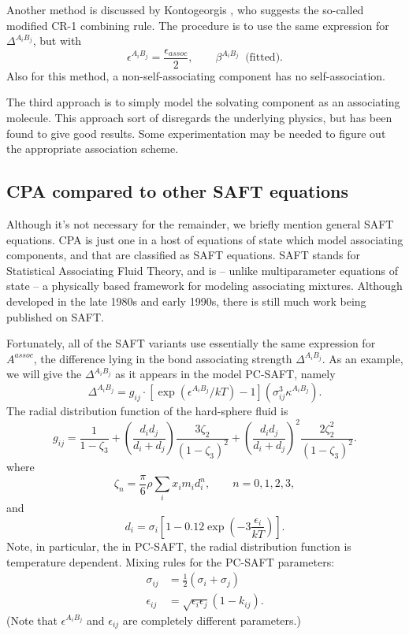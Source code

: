 \documentclass[english]{../thermomemo/thermomemo}
\newcommand{\z}{\zeta}
\newcommand{\lp}{\left(}
\newcommand{\rp}{\right)}
\begin{document}
Another method is discussed by Kontogeorgis \cite{Kontogeorgis10}, who suggests the so-called modified CR-1 combining rule. The procedure is to use the same expression for $\Delta^{A_i B_j}$, but with
\begin{equation}
  \epsilon^{A_i B_j} = \frac{\epsilon_{assoc}}{2}, \qquad \beta^{A_i B_j} \ \text{ (fitted)}.
\end{equation}
Also for this method, a non-self-associating component has no self-association.

The third approach is to simply model the solvating component as an associating molecule. This approach sort of disregards the underlying physics, but has been found to give good results. Some experimentation may be needed to figure out the appropriate association scheme. %


\subsection{CPA compared to other SAFT equations}
Although it's not necessary for the remainder, we briefly mention general SAFT equations. CPA is just one in a host of equations of state which model associating components, and that are classified as SAFT equations. SAFT stands for Statistical Associating Fluid Theory, and is -- unlike multiparameter equations of state -- a physically based framework for modeling associating mixtures. Although developed in the late 1980s and early 1990s, there is still much work being published on SAFT.

Fortunately, all of the SAFT variants use essentially the same expression for $A^{assoc}$, the difference lying in the bond associating strength $\Delta^{A_i B_j}$. As an example, we will give the $\Delta^{A_i B_j}$ as it appears in the model PC-SAFT, namely
\begin{equation}
  \label{ascStrength}
  \Delta^{A_i B_j} = g_{ij} \cdot [\exp(\epsilon^{A_i B_j}/kT) - 1](\sigma_{ij}^3 \kappa^{A_i B_j}).
\end{equation}
The radial distribution function of the hard-sphere fluid is
\begin{equation}
  \label{gij}
  g_{ij} = \frac{1}{1-\z_3} + \lp \frac{d_id_j}{d_i+d_j} \rp \frac{3\z_2}{(1-\z_3)^2} + \lp \frac{d_i d_j}{d_i+d_j} \rp^2 \frac{2\z_2^2}{(1-\z_3)^2}.
\end{equation}
where
\begin{equation}
  \z_n = \frac{\pi}{6} \rho \sum_i x_i m_i d_i^n, \qquad n = 0,1,2,3,
\end{equation}
and
\begin{equation}
  d_i = \sigma_i \left[1 - 0.12\exp \lp -3\frac{\epsilon_i}{kT} \rp \right].
\end{equation}
Note, in particular, the in PC-SAFT, the radial distribution function is temperature dependent. Mixing rules for the PC-SAFT parameters:
\begin{align}
  \sigma_{ij} &= \frac{1}{2}(\sigma_i + \sigma_j) \\
  \epsilon_{ij} &= \sqrt{\epsilon_i \epsilon_j}(1-k_{ij}).
\end{align}
(Note that $\epsilon^{A_i B_j}$ and $\epsilon_{ij}$ are completely different parameters.)
\end{document}
